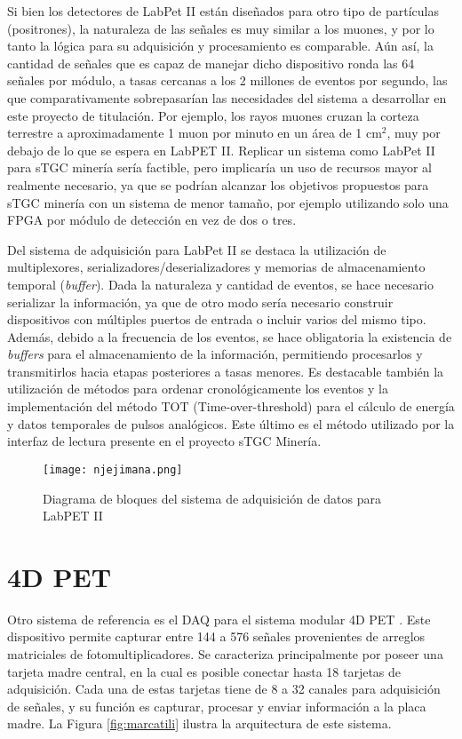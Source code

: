 	Si bien los detectores de LabPet II están diseñados para otro tipo de partículas (positrones), la naturaleza de las señales es muy similar a los muones, y por lo tanto la lógica para su adquisición y procesamiento es comparable. Aún así, la cantidad de señales que es capaz de manejar dicho dispositivo ronda las 64 señales por módulo, a tasas cercanas a los 2 millones de eventos por segundo, las que comparativamente sobrepasarían las necesidades del sistema a desarrollar en este proyecto de titulación. Por ejemplo, los rayos muones cruzan la corteza terrestre a aproximadamente 1 muon por minuto en un área de 1 cm$^2$\cite{Rocca2018CosmicUs}, muy por debajo de lo que se espera en LabPET II. Replicar un sistema como LabPet II para sTGC minería sería factible, pero implicaría un uso de recursos mayor al realmente necesario, ya que se podrían alcanzar los objetivos propuestos para sTGC minería con un sistema de menor tamaño, por ejemplo utilizando solo una FPGA por módulo de detección en vez de dos o tres.
	
	Del sistema de adquisición para LabPet II se destaca la utilización de multiplexores, serializadores/deserializadores y memorias de almacenamiento temporal (\textit{buffer}). Dada la naturaleza y cantidad de eventos, se hace necesario serializar la información, ya que de otro modo sería necesario construir dispositivos con múltiples puertos de entrada o incluir varios del mismo tipo. Además, debido a la frecuencia de los eventos, se hace obligatoria la existencia de \textit{buffers} para el almacenamiento de la información, permitiendo procesarlos y transmitirlos hacia etapas posteriores a tasas menores. Es destacable también la utilización de métodos para ordenar cronológicamente los eventos y la implementación del método TOT (Time-over-threshold)\cite{Orita2018TheSystem} para el cálculo de energía y datos temporales de pulsos analógicos. Este último es el método utilizado por la interfaz de lectura presente en el proyecto sTGC Minería.
	
	\begin{figure}[h]
		\centering
		\texttt{[image: njejimana.png]}
		\caption{Diagrama de bloques del sistema de adquisición de datos para LabPET II \cite{Njejimana2013DesignImaging}}
		\label{fig:njejimana}
	\end{figure}
	
\newpage
\section{4D PET}
\label{par:4dpet}
	Otro sistema de referencia es el DAQ para el sistema modular 4D PET \cite{Marcatili2011DevelopmentDetector}. Este dispositivo permite capturar entre 144 a 576 señales provenientes de arreglos matriciales de fotomultiplicadores. Se caracteriza principalmente por poseer una tarjeta madre central, en la cual es posible conectar hasta 18 tarjetas de adquisición. Cada una de estas tarjetas tiene de 8 a 32 canales para adquisición de señales, y su función es capturar, procesar y enviar información a la placa madre. La Figura \ref{fig:marcatili} ilustra la arquitectura de este sistema.
		
